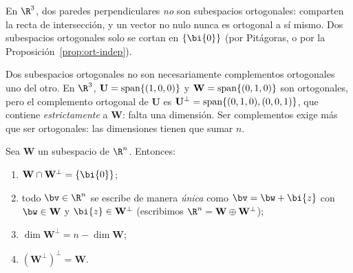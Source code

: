 En $\R^3$, dos paredes perpendiculares \emph{no} son subespacios ortogonales:
comparten la recta de intersección, y un vector no nulo nunca es ortogonal a
sí mismo. Dos subespacios ortogonales solo se cortan en $\{\bi{0}\}$ (por
Pitágoras, o por la Proposición~\ref{prop:ort-indep}).

\begin{observacion}
Dos subespacios ortogonales no son necesariamente complementos ortogonales
uno del otro. En $\R^3$, $\mathbf{U}=\hbox{span}\{(1,0,0)\}$ y
$\mathbf{W}=\hbox{span}\{(0,1,0)\}$ son ortogonales, pero el complemento
ortogonal de $\mathbf{U}$ es
$\mathbf{U}^{\perp}=\hbox{span}\{(0,1,0),(0,0,1)\}$, que contiene
\emph{estrictamente} a $\mathbf{W}$: falta una dimensión. Ser
complementos exige más que ser ortogonales: las dimensiones tienen que
sumar $n$.
\end{observacion}

\begin{proposicion}\label{prop:descomposicion}
Sea $\mathbf{W}$ un subespacio de $\R^n$. Entonces:
\begin{enumerate}[label=(\roman*),itemsep=1pt]
\item $\mathbf{W}\cap\mathbf{W}^{\perp}=\{\bi{0}\}$;
\item todo $\bv\in\R^n$ se escribe de manera \emph{única} como
$\bv=\bw+\bi{z}$ con $\bw\in\mathbf{W}$ y $\bi{z}\in\mathbf{W}^{\perp}$
(escribimos $\R^n=\mathbf{W}\oplus\mathbf{W}^{\perp}$);
\item $\dim\mathbf{W}^{\perp}=n-\dim\mathbf{W}$;
\item $(\mathbf{W}^{\perp})^{\perp}=\mathbf{W}$.
\end{enumerate}
\end{proposicion}

